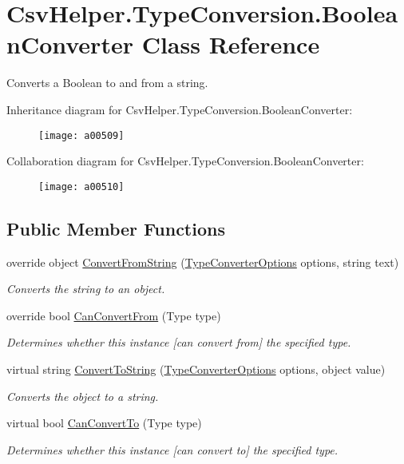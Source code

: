 \hypertarget{a00045}{\section{Csv\-Helper.\-Type\-Conversion.\-Boolean\-Converter Class Reference}
\label{a00045}
}


Converts a Boolean to and from a string.  




Inheritance diagram for Csv\-Helper.\-Type\-Conversion.\-Boolean\-Converter\-:
\nopagebreak
\begin{figure}[H]
\begin{center}
\leavevmode
\texttt{[image: a00509]}
\end{center}
\end{figure}


Collaboration diagram for Csv\-Helper.\-Type\-Conversion.\-Boolean\-Converter\-:
\nopagebreak
\begin{figure}[H]
\begin{center}
\leavevmode
\texttt{[image: a00510]}
\end{center}
\end{figure}
\subsection*{Public Member Functions}
\begin{DoxyCompactItemize}
\item 
override object \hyperlink{a00045_abc77c631974272fd1dfe3fe4fcc3bf28}{Convert\-From\-String} (\hyperlink{a00178}{Type\-Converter\-Options} options, string text)
\begin{DoxyCompactList}\small\item\em Converts the string to an object. \end{DoxyCompactList}\item 
override bool \hyperlink{a00045_a0be20573af4ee53409bb437125a64268}{Can\-Convert\-From} (Type type)
\begin{DoxyCompactList}\small\item\em Determines whether this instance \mbox{[}can convert from\mbox{]} the specified type. \end{DoxyCompactList}\item 
virtual string \hyperlink{a00088_a36cb2f9b24f15a671293f3a722324c27}{Convert\-To\-String} (\hyperlink{a00178}{Type\-Converter\-Options} options, object value)
\begin{DoxyCompactList}\small\item\em Converts the object to a string. \end{DoxyCompactList}\item 
virtual bool \hyperlink{a00088_acb65bd8c8199d88d5b1629ae35d18514}{Can\-Convert\-To} (Type type)
\begin{DoxyCompactList}\small\item\em Determines whether this instance \mbox{[}can convert to\mbox{]} the specified type. \end{DoxyCompactList}\end{DoxyCompactItemize}


